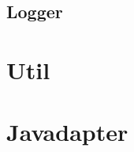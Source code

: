 




\subsection{Logger}
\label{sub:logger}



\section{Util} 
\label{sec:util}



\section{Javadapter} 
\label{sec:javadapter}



